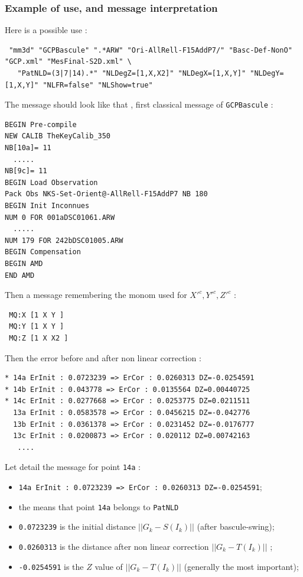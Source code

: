 \subsubsection{Example of use, and message interpretation}

Here is a possible use :

{\small
\begin{verbatim}
 "mm3d" "GCPBascule" ".*ARW" "Ori-AllRell-F15AddP7/" "Basc-Def-NonO" "GCP.xml" "MesFinal-S2D.xml" \
   "PatNLD=(3|7|14).*" "NLDegZ=[1,X,X2]" "NLDegX=[1,X,Y]" "NLDegY=[1,X,Y]" "NLFR=false" "NLShow=true"
\end{verbatim}
}

The message should look like that , first classical message of {\tt GCPBascule} :

\begin{verbatim}
BEGIN Pre-compile
NEW CALIB TheKeyCalib_350
NB[10a]= 11
  .....
NB[9c]= 11
BEGIN Load Observation
Pack Obs NKS-Set-Orient@-AllRell-F15AddP7 NB 180
BEGIN Init Inconnues
NUM 0 FOR 001aDSC01061.ARW
  .....
NUM 179 FOR 242bDSC01005.ARW
BEGIN Compensation
BEGIN AMD
END AMD
\end{verbatim}

Then  a message remembering the monom used for $X'^c,Y'^c,Z'^c$ :

\begin{verbatim}
 MQ:X [1 X Y ]
 MQ:Y [1 X Y ]
 MQ:Z [1 X X2 ]
\end{verbatim}

Then the error before and after non linear correction :

\begin{verbatim}
* 14a ErInit : 0.0723239 => ErCor : 0.0260313 DZ=-0.0254591
* 14b ErInit : 0.043778 => ErCor : 0.0135564 DZ=0.00440725
* 14c ErInit : 0.0277668 => ErCor : 0.0253775 DZ=0.0211511
  13a ErInit : 0.0583578 => ErCor : 0.0456215 DZ=-0.042776
  13b ErInit : 0.0361378 => ErCor : 0.0231452 DZ=-0.0176777
  13c ErInit : 0.0200873 => ErCor : 0.020112 DZ=0.00742163
   ....
\end{verbatim}

Let detail the message for point {\tt  14a} :
\begin{itemize}

 \item {\tt * 14a ErInit : 0.0723239 => ErCor : 0.0260313 DZ=-0.0254591};
 \item the {\tt *} means that point {\tt  14a} belongs to {\tt PatNLD}
 \item {\tt 0.0723239} is the initial distance $||G_k - S(I_k)||$ (after bascule-swing);
 \item {\tt 0.0260313} is the distance after non linear correction $||G_k - T(I_k)||$ ;
 \item {\tt -0.0254591} is the $Z$ value of $||G_k - T(I_k)||$ (generally the most important);

\end{itemize}


